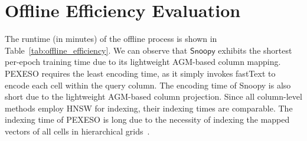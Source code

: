 \begin{table}[h]
\small
\centering
\caption{Accuracy of equi-join search. The best are in bold.}
\vspace{-3mm}
\renewcommand{\arraystretch}{1.2} %
\label{tab:equi-join}
\vspace{-3mm}
\end{table}


\newpage
\section{Offline Efficiency Evaluation}
\label{appendix:C}
The runtime (in minutes) of the offline process is shown in Table~\ref{tab:offline_efficiency}. We can observe that $\textsf{Snoopy}$ exhibits the shortest per-epoch training time due to its lightweight AGM-based column mapping. PEXESO requires the least encoding time, as it simply invokes fastText to encode each cell within the query column.
The encoding time of Snoopy is also short
due to the lightweight AGM-based column projection.  Since all column-level methods employ HNSW for indexing, their indexing times are comparable. The indexing time of PEXESO is long 
due to the necessity of indexing the mapped vectors of all cells in hierarchical grids~\cite{Pexeso}.



